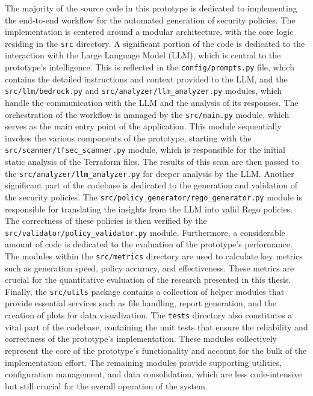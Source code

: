 The majority of the source code in this prototype is dedicated to implementing the end-to-end workflow for the automated generation of security policies. The implementation is centered around a modular architecture, with the core logic residing in the \texttt{src} directory. A significant portion of the code is dedicated to the interaction with the Large Language Model (LLM), which is central to the prototype's intelligence. This is reflected in the \texttt{config/prompts.py} file, which contains the detailed instructions and context provided to the LLM, and the \texttt{src/llm/bedrock.py} and \texttt{src/analyzer/llm\_analyzer.py} modules, which handle the communication with the LLM and the analysis of its responses. The orchestration of the workflow is managed by the \texttt{src/main.py} module, which serves as the main entry point of the application. This module sequentially invokes the various components of the prototype, starting with the \texttt{src/scanner/tfsec\_scanner.py} module, which is responsible for the initial static analysis of the Terraform files. The results of this scan are then passed to the \texttt{src/analyzer/llm\_analyzer.py} for deeper analysis by the LLM.
Another significant part of the codebase is dedicated to the generation and validation of the security policies. The \texttt{src/policy\_generator/rego\_generator.py} module is responsible for translating the insights from the LLM into valid Rego policies. The correctness of these policies is then verified by the \texttt{src/validator/policy\_validator.py} module.
Furthermore, a considerable amount of code is dedicated to the evaluation of the prototype's performance. The modules within the \texttt{src/metrics} directory are used to calculate key metrics such as generation speed, policy accuracy, and effectiveness. These metrics are crucial for the quantitative evaluation of the research presented in this thesis.
Finally, the \texttt{src/utils} package contains a collection of helper modules that provide essential services such as file handling, report generation, and the creation of plots for data visualization. The \texttt{tests} directory also constitutes a vital part of the codebase, containing the unit tests that ensure the reliability and correctness of the prototype's implementation. These modules collectively represent the core of the prototype's functionality and account for the bulk of the implementation effort. The remaining modules provide supporting utilities, configuration management, and data consolidation, which are less code-intensive but still crucial for the overall operation of the system.

